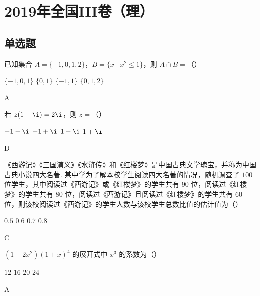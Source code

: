 \chapter{2019年全国III卷（理）}

\section{单选题}

\begin{problem}
已知集合 \(A=\{-1,0,1,2\}\)，\(B=\{x\mid x^2\le1\}\)，则 \(A\cap B=\)（\quad）

\choices
    {\(\{-1,0,1\}\)}
    {\(\{0,1\}\)}
    {\(\{-1,1\}\)}
    {\(\{0,1,2\}\)}
\end{problem}

\begin{answer}
A
\end{answer}

\begin{problem}
若 \(z(1+\i)=2\i\)，则 \(z=\)（\quad）

\choices
    {\(-1-\i\)}
    {\(-1+\i\)}
    {\(1-\i\)}
    {\(1+\i\)}
\end{problem}

\begin{answer}
D
\end{answer}

\begin{problem}
《西游记》《三国演义》《水浒传》和《红楼梦》是中国古典文学瑰宝，并称为中国古典小说四大名著. 某中学为了解本校学生阅读四大名著的情况，随机调查了 \(100\) 位学生，其中阅读过《西游记》或《红楼梦》的学生共有 \(90\) 位，阅读过《红楼梦》的学生共有 \(80\) 位，阅读过《西游记》且阅读过《红楼梦》的学生共有 \(60\) 位，则该校阅读过《西游记》的学生人数与该校学生总数比值的估计值为（\quad）

\choices
    {\(0.5\)}
    {\(0.6\)}
    {\(0.7\)}
    {\(0.8\)}
\end{problem}

\begin{answer}
C
\end{answer}

\begin{problem}
\((1+2x^2)(1+x)^4\) 的展开式中 \(x^3\) 的系数为（\quad）

\choices
    {\(12\)}
    {\(16\)}
    {\(20\)}
    {\(24\)}
\end{problem}

\begin{answer}
A
\end{answer}

